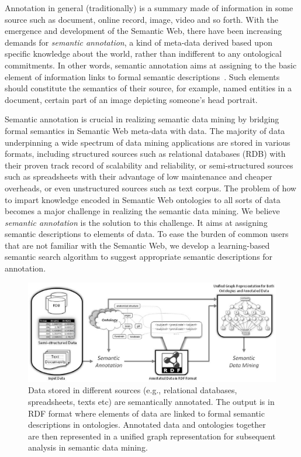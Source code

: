 Annotation in general (traditionally) is a summary made of information in some source such as document, online record, image, video and so forth. With the emergence and development of the Semantic Web, there have been increasing demands for \emph{semantic annotation}, a kind of meta-data derived based upon specific knowledge about the world, rather than indifferent to any ontological commitments. In other words, semantic annotation aims at assigning to the basic element of information links to formal semantic descriptions~\cite{KiryakovEtal04}. Such elements should constitute the semantics of their source, for example, named entities in a document, certain part of an image depicting someone's head portrait.

Semantic annotation is crucial in realizing semantic data mining by bridging formal semantics in Semantic Web meta-data with data. The majority of data underpinning a wide spectrum of data mining applications are stored in various formats, including structured sources such as relational databases (RDB) with their proven track record of scalability and reliability, or semi-structured sources such as spreadsheets with their advantage of low maintenance and cheaper overheads, or even unstructured sources such as text corpus. The problem of how to impart knowledge encoded in Semantic Web ontologies to all sorts of data becomes a major challenge in realizing the semantic data mining. We believe \emph{semantic annotation} is the solution to this challenge. It aims at assigning semantic descriptions to elements of data. To ease the burden of common users that are not familiar with the Semantic Web, we develop a learning-based semantic search algorithm to suggest appropriate semantic descriptions for annotation.

\begin{figure}[tbh]
\begin{center}
\includegraphics[width=\textwidth, trim=0 7cm 0 6cm, clip=true]{fig/thesis-semantic-annotation-workflow.eps}
\end{center}
\caption[Semantic annotation in the workflow of semantic data mining.]{\label{fig:annotation-workflow} Data stored in different sources (e.g., relational databases, spreadsheets, texts etc) are semantically annotated. The output is in RDF format where elements of data are linked to formal semantic descriptions in ontologies. Annotated data and ontologies together are then represented in a unified graph representation for subsequent analysis in semantic data mining.}
\end{figure}

